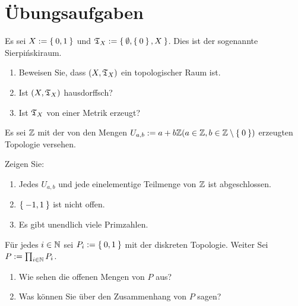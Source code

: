 \clearpage
\section*{Übungsaufgaben}

\begin{aufgabe}[Sierpińskiraum]\label{ub1:aufg1}
    Es sei $X := \Set{0,1}$ und $\mathfrak{T}_X := \Set{\emptyset, \Set{0}, X}$.
    Dies ist der sogenannte Sierpińskiraum.
    \begin{enumerate}[label=(\alph*)]
        \item Beweisen Sie, dass $(X, \mathfrak{T}_X)$ ein topologischer Raum ist.
        \item Ist $(X, \mathfrak{T}_X)$ hausdorffsch?
        \item Ist $\mathfrak{T}_X$ von einer Metrik erzeugt?
    \end{enumerate}
\end{aufgabe}

\begin{aufgabe}\label{ub1:aufg4}
    Es sei $\mathbb{Z}$ mit der von den Mengen $U_{a,b} := a + b \mathbb{Z} (a \in \mathbb{Z}, b \in \mathbb{Z} \setminus \Set{0})$
    erzeugten Topologie versehen.

    Zeigen Sie:
    \begin{enumerate}[label=(\alph*)]
        \item Jedes $U_{a,b}$ und jede einelementige Teilmenge von $\mathbb{Z}$ ist abgeschlossen.
        \item $\Set{-1, 1}$ ist nicht offen.
        \item Es gibt unendlich viele Primzahlen.
    \end{enumerate}
\end{aufgabe}

\begin{aufgabe}\label{ub2:aufg4}
    Für jedes $i \in \mathbb{N}$ sei $P_i := \Set{0,1}$ mit der diskreten
    Topologie. Weiter Sei $P := \prod_{i \in \mathbb{N}} P_i$.

    \begin{enumerate}[label=(\alph*)]
        \item Wie sehen die offenen Mengen von $P$ aus?
        \item Was können Sie über den Zusammenhang von $P$ sagen?
    \end{enumerate}
\end{aufgabe}
